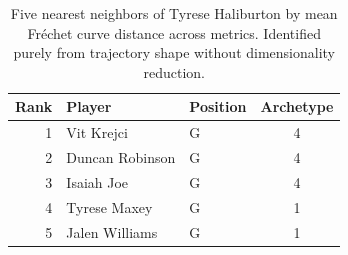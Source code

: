 \begin{table}[htbp]
  \centering\small
  \begin{tabular}{rllc}
    \toprule
    Rank & Player & Position & Archetype \\
    \midrule
    1 & Vit Krejci & G & 4 \\
    2 & Duncan Robinson & G & 4 \\
    3 & Isaiah Joe & G & 4 \\
    4 & Tyrese Maxey & G & 1 \\
    5 & Jalen Williams & G & 1 \\
    \bottomrule
  \end{tabular}
  \caption{Five nearest neighbors of Tyrese Haliburton by mean Fr\'{e}chet curve distance across metrics. Identified purely from trajectory shape without dimensionality reduction.}
  \label{tab:Tyrese_Haliburton_frechet_curve_neighbors}
\end{table}


